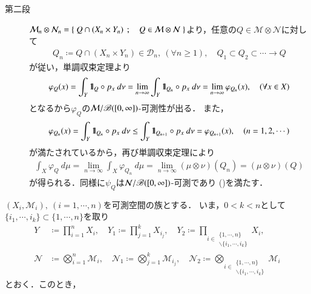 \begin{prf}
\begin{description}
			\item[第二段]
				$\mathcal{M}_n \otimes \mathcal{N}_n = \left\{\ Q \cap (X_n \times Y_n)\ \, ; \quad Q \in \mathcal{M} \otimes \mathcal{N}\ \right\}$より，任意の$Q \in \mathcal{M} \otimes \mathcal{N}$に対して
				\begin{align}
					Q_n \coloneqq Q \cap (X_n \times Y_n) \in \mathcal{D}_n,
					\ (\forall n \geq 1),
					\quad Q_1 \subset Q_2 \subset \cdots \longrightarrow Q
				\end{align}
				が従い，単調収束定理より
				\begin{align}
					\varphi_Q(x) = \int_Y \mbox{1}\hspace{-0.25em}\mbox{l}_Q \circ p_x\ d\nu
					= \lim_{n \to \infty} \int_Y \mbox{1}\hspace{-0.25em}\mbox{l}_{Q_n} \circ p_x\ d\nu
					= \lim_{n \to \infty} \varphi_{Q_n}(x),
					\quad (\forall x \in X)
				\end{align}
				となるから$\varphi_Q$の$\mathcal{M}/\mathscr{B}([0,\infty])$-可測性が出る．
				また，
				\begin{align}
					\varphi_{Q_n}(x) = \int_Y \defunc_{Q_n} \circ p_x\ d\nu
					\leq \int_Y \defunc_{Q_{n+1}} \circ p_x\ d\nu
					= \varphi_{Q_{n+1}}(x),
					\quad (n=1,2,\cdots)
				\end{align}
				が満たされているから，再び単調収束定理により
				\begin{align}
					\int_X \varphi_Q\ d\mu
					= \lim_{n \to \infty} \int_X \varphi_{Q_n}\ d\mu
					= \lim_{n \to \infty} (\mu \otimes \nu)(Q_n)
					= (\mu \otimes \nu)(Q)
				\end{align}
				が得られる．同様に$\psi_Q$は$\mathcal{N}/\mathscr{B}([0,\infty])$-可測であり
				()を満たす．
				\QED
		\end{description}
	\end{prf}
	
	$(X_i,\mathcal{M}_i),\ (i=1,\cdots,n)$を可測空間の族とする．
	いま，$0 < k < n$として$\{i_1,\cdots,i_k\} \subset \{1,\cdots,n\}$を取り
	\begin{align}
		Y &\coloneqq \prod_{i=1}^n X_i,
		\quad Y_1 \coloneqq \prod_{j=1}^k X_{i_j},
		\quad Y_2 \coloneqq \prod_{i \in \substack{\{1,\cdots,n\} \\ \backslash \{i_1,\cdots,i_k\}}} X_i, \\
		\mathcal{N} &\coloneqq \bigotimes_{i=1}^n \mathcal{M}_i,
		\quad \mathcal{N}_1 \coloneqq \bigotimes_{j=1}^k \mathcal{M}_{i_j},
		\quad \mathcal{N}_2 \coloneqq \bigotimes_{i \in \substack{\{1,\cdots,n\} \\ \backslash \{i_1,\cdots,i_k\}}} \mathcal{M}_i
	\end{align}
	とおく．このとき，